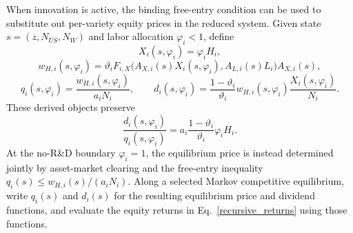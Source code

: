 \documentclass{article}
\def\green#1{#1}%
\begin{document}
\green{When} innovation \green{is active}, the \green{binding} free-entry condition can be used to substitute out per-variety equity prices in the reduced system. Given state $s=(z,N_{US},N_W)$ and labor allocation $\varphi_i\green{<1}$, define
\[
X_i(s,\varphi_i)=\varphi_iH_i,
\]
\[
w_{H,i}(s,\varphi_i)
=
\vartheta_i
F_{i,X}
\bigl(A_{X,i}(s)X_i(s,\varphi_i),A_{L,i}(s)L_i\bigr)
A_{X,i}(s),
\]
\[
q_i(s,\varphi_i)=\frac{w_{H,i}(s,\varphi_i)}{a_iN_i},
\qquad
d_i(s,\varphi_i)
=
\frac{1-\vartheta_i}{\vartheta_i}
w_{H,i}(s,\varphi_i)\frac{X_i(s,\varphi_i)}{N_i}.
\]
These derived objects preserve
\[
\frac{d_i(s,\varphi_i)}{q_i(s,\varphi_i)}
=
a_i\frac{1-\vartheta_i}{\vartheta_i}\varphi_iH_i.
\]
\green{At the no-R}\&\green{D boundary} $\green{\varphi}_\green{i=1}$, \green{the equilibrium price is instead determined jointly by asset-market clearing and the free-entry inequality} $\green{q}_\green{i}(\green{s})\green{\le w}_{\green{H},\green{i}}(\green{s})\green{/}(\green{a}_\green{iN}_\green{i})$.  Along a selected Markov competitive equilibrium, write $q_i(s)$ and $d_i(s)$ for \green{the resulting equilibrium price and dividend} functions, and evaluate the equity returns in Eq.~\eqref{recursive_returns} using those functions.
\end{document}
